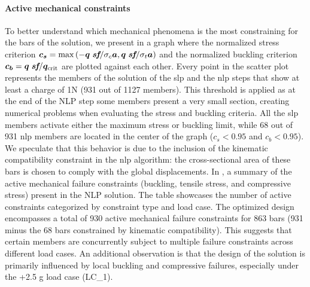\paragraph{Active mechanical constraints}
To better understand which mechanical phenomena is the most constraining for the bars of the solution, we present in  a graph where the normalized stress criterion $\bm{c_s}=\max{\left(-\bm{q} \; \textit{\textbf{sf}}/\sigma_c \bm{a},\bm{q} \; \textit{\textbf{sf}}/\sigma_t \bm{a}\right)}$ and the normalized buckling criterion $\bm{c_b}=\bm{q}\; \textit{\textbf{sf}}/\bm{q}_{\text{crit}}$ are plotted against each other. Every point in the scatter plot represents the members of the solution of the \gls{slp} and the \gls{nlp} steps that show at least a charge of 1N (931 out of 1127 members). This threshold is applied as at the end of the NLP step some members present a very small section, creating numerical problems when evaluating the stress and buckling criteria. All the \gls{slp} members activate either the maximum stress or buckling limit, while 68 out of 931 \gls{nlp} members are located in the center of the graph ($c_s<0.95$ and $c_b<0.95$). We speculate that this behavior is due to the inclusion of the kinematic compatibility constraint in the \gls{nlp} algorithm: the cross-sectional area of these bars is chosen to comply with the global displacements. In , a summary of the active mechanical failure constraints (buckling, tensile stress, and compressive stress) present in the NLP solution. The table showcases the number of active constraints categorized by constraint type and load case. The optimized design encompasses a total of 930 active mechanical failure constraints for 863 bars (931 minus the 68 bars constrained by kinematic compatibility). This suggests that certain members are concurrently subject to multiple failure constraints across different load cases. An additional observation is that the design of the solution is primarily influenced by local buckling and compressive failures, especially under the +2.5 g load case (LC\_1).

